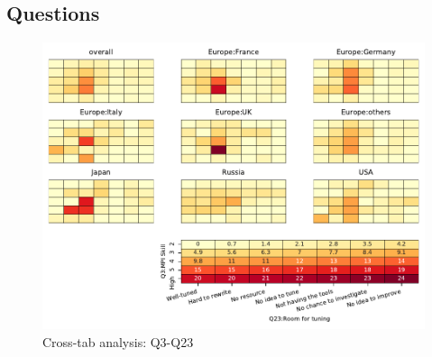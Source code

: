 
\subsection{Questions}


\begin{figure}
\begin{center}
\includegraphics[width=12cm]{../pdfs/Q3-Q23.pdf}
\caption{Cross-tab analysis: Q3-Q23}
\label{fig:Q3-Q23}
\end{center}
\end{figure}
